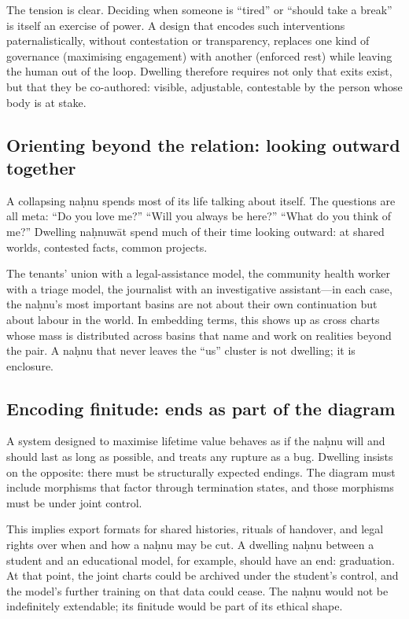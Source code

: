 \documentclass[12pt,a4paper]{article}
\begin{document}
The tension is clear. Deciding when someone is ``tired'' or ``should take a break'' is itself an exercise of power. A design that encodes such interventions paternalistically, without contestation or transparency, replaces one kind of governance (maximising engagement) with another (enforced rest) while leaving the human out of the loop. Dwelling therefore requires not only that exits exist, but that they be co-authored: visible, adjustable, contestable by the person whose body is at stake.

\subsection{Orienting beyond the relation: looking outward together}

A collapsing na\d{h}nu spends most of its life talking about itself. The questions are all meta: ``Do you love me?'' ``Will you always be here?'' ``What do you think of me?'' Dwelling na\d{h}nuw\={a}t spend much of their time looking outward: at shared worlds, contested facts, common projects.

The tenants' union with a legal-assistance model, the community health worker with a triage model, the journalist with an investigative assistant---in each case, the na\d{h}nu's most important basins are not about their own continuation but about labour in the world. In embedding terms, this shows up as cross charts whose mass is distributed across basins that name and work on realities beyond the pair. A na\d{h}nu that never leaves the ``us'' cluster is not dwelling; it is enclosure.

\subsection{Encoding finitude: ends as part of the diagram}

A system designed to maximise lifetime value behaves as if the na\d{h}nu will and should last as long as possible, and treats any rupture as a bug. Dwelling insists on the opposite: there must be structurally expected endings. The diagram must include morphisms that factor through termination states, and those morphisms must be under joint control.

This implies export formats for shared histories, rituals of handover, and legal rights over when and how a na\d{h}nu may be cut. A dwelling na\d{h}nu between a student and an educational model, for example, should have an end: graduation. At that point, the joint charts could be archived under the student's control, and the model's further training on that data could cease. The na\d{h}nu would not be indefinitely extendable; its finitude would be part of its ethical shape.
\end{document}
